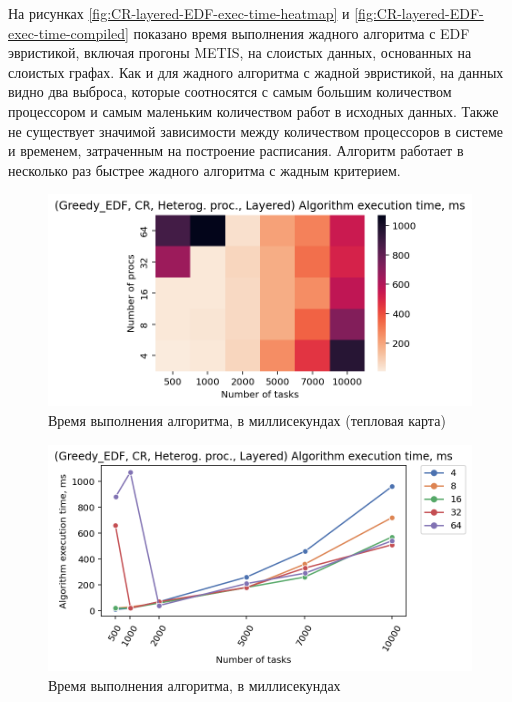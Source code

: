 На рисунках \ref{fig:CR-layered-EDF-exec-time-heatmap} и \ref{fig:CR-layered-EDF-exec-time-compiled} показано время выполнения жадного алгоритма с EDF эвристикой, включая прогоны METIS, на слоистых данных, основанных на слоистых графах. Как и для жадного алгоритма с жадной эвристикой, на данных видно два выброса, которые соотносятся с самым большим количеством процессором и самым маленьким количеством работ в исходных данных. Также не существует значимой зависимости между количеством процессоров в системе и временем, затраченным на построение расписания. Алгоритм работает в несколько раз быстрее жадного алгоритма с жадным критерием.

\begin{figure}[!htbp]
    \centering
    \includegraphics[width=\textwidth]{imgs/unbalanced/CR_EDF/et_heatmap.png}
    \caption{Время выполнения алгоритма, в миллисекундах (тепловая карта)}
    \label{fig:CR-unbalanced-EDF-exec-time-heatmap}
\end{figure}

\begin{figure}[!htbp]
    \centering
    \includegraphics[width=\textwidth]{imgs/unbalanced/CR_EDF/tr_graph.png}
    \caption{Время выполнения алгоритма, в миллисекундах}
    \label{fig:CR-unbalanced-EDF-exec-time-compiled}
\end{figure}

